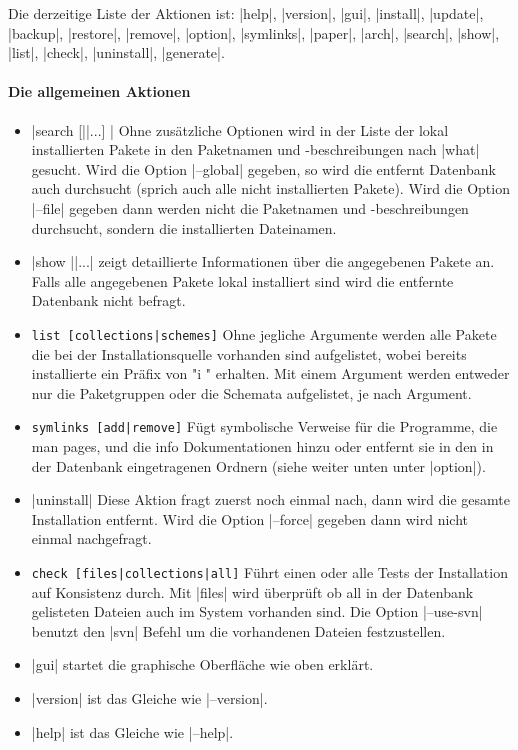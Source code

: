 Die derzeitige Liste der Aktionen ist:
|help|, |version|, |gui|, |install|, |update|, |backup|, |restore|,
|remove|, |option|, |symlinks|, |paper|, |arch|, |search|, |show|, |list|,
|check|, |uninstall|, |generate|.

\paragraph{Die allgemeinen Aktionen}

\begin{itemize}
\item |search [||...] | Ohne zusätzliche Optionen
  wird in der Liste der lokal installierten Pakete in den Paketnamen und
  -beschreibungen nach |what| gesucht. Wird die Option |--global| gegeben,
  so wird die entfernt Datenbank auch durchsucht (sprich auch alle nicht
  installierten Pakete). Wird die Option |--file| gegeben dann werden
  nicht die Paketnamen und -beschreibungen durchsucht, sondern die 
  installierten Dateinamen.
\item |show ||...| zeigt detaillierte Informationen über die
  angegebenen Pakete an. Falls alle angegebenen Pakete lokal installiert
  sind wird die entfernte Datenbank nicht befragt.
\item \Verb+list [collections|schemes]+ Ohne jegliche Argumente werden alle
  Pakete die bei der Installationsquelle vorhanden sind aufgelistet, wobei
  bereits installierte ein Präfix von "i " erhalten.
  Mit einem Argument werden entweder nur die Paketgruppen oder die Schemata
  aufgelistet, je nach Argument.
\item \Verb+symlinks [add|remove]+ Fügt symbolische Verweise für die
  Programme, die man pages, und die info Dokumentationen hinzu oder
  entfernt sie in den in der Datenbank eingetragenen Ordnern (siehe weiter
  unten unter |option|).
\item |uninstall| Diese Aktion fragt zuerst noch einmal nach, dann wird
  die gesamte Installation entfernt. Wird die Option |--force| gegeben dann
  wird nicht einmal nachgefragt. 
\item \Verb+check [files|collections|all]+ Führt einen oder alle Tests
  der Installation auf Konsistenz durch. Mit |files| wird überprüft
  ob all in der Datenbank gelisteten Dateien auch im System vorhanden 
  sind. Die Option |--use-svn| benutzt den |svn| Befehl um die 
  vorhandenen Dateien festzustellen.
\item |gui| startet die graphische Oberfläche wie oben erklärt.
\item |version| ist das Gleiche wie  |--version|.
\item |help| ist das Gleiche wie |--help|.
\end{itemize}


